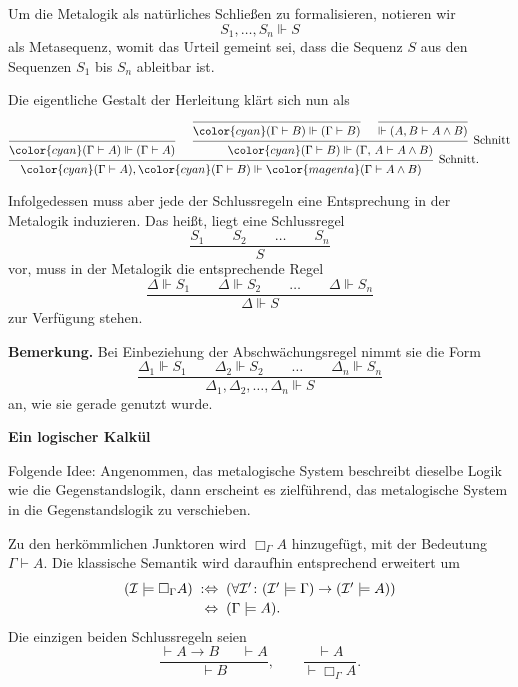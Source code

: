 \documentclass[9pt,fleqn,aspectratio=169]{beamer}
\newcommand{\strong}[1]{\textbf{#1}}
\newcommand{\parspace}{\vspace{0.8em}}
\newcommand{\headline}[1]{\begin{center}\strong{#1}\end{center}}
\newcommand{\lnec}{\Box}
\begin{document}
\begin{frame}
Um die Metalogik als natürliches Schließen zu formalisieren,
notieren wir
\[S_1,\ldots,S_n\Vdash S\]
als Metasequenz, womit das Urteil gemeint sei, dass die Sequenz $S$ aus
den Sequenzen $S_1$ bis $S_n$ ableitbar ist.\pause

\parspace
Die eigentliche Gestalt der Herleitung klärt sich nun als
\[\begin{prooftree}
  \infer0{{\color{cyan}(\Gamma\vdash A)}\Vdash (\Gamma\vdash A)}
    \infer0{{\color{cyan}(\Gamma\vdash B)}\Vdash (\Gamma\vdash B)}
    \infer0{\Vdash (A,B\vdash A\land B)}
  \infer2[Schnitt]{{\color{cyan}(\Gamma\vdash B)}\Vdash (\Gamma,\,A\vdash A\land B)}
\infer2[Schnitt.]{{\color{cyan}(\Gamma\vdash A)},{\color{cyan}(\Gamma\vdash B)}\Vdash
  \color{magenta}(\Gamma\vdash A\land B)}
\end{prooftree}\]
\end{frame}

\begin{frame}
Infolgedessen muss aber jede der Schlussregeln eine Entsprechung
in der Metalogik induzieren. Das heißt, liegt eine Schlussregel
\[\dfrac{S_1\qquad S_2\qquad\ldots\qquad S_n}{S}\]
vor, muss in der Metalogik die entsprechende Regel
\[\dfrac{\Delta\Vdash S_1\qquad\Delta\Vdash S_2\qquad\ldots\qquad\Delta\Vdash S_n}
{\Delta\Vdash S}\]
zur Verfügung stehen.\pause

\parspace
\begin{footnotesize}
\strong{Bemerkung.} Bei Einbeziehung der Abschwächungsregel nimmt sie die Form
\[\dfrac{\Delta_1\Vdash S_1\qquad\Delta_2\Vdash S_2\qquad\ldots\qquad\Delta_n\Vdash S_n}
{\Delta_1,\Delta_2,\ldots,\Delta_n\Vdash S}\]
an, wie sie gerade genutzt wurde.
\end{footnotesize}
\end{frame}

\begin{frame}
\headline{Ein logischer Kalkül}
\end{frame}

\begin{frame}
Folgende Idee: Angenommen, das metalogische System beschreibt dieselbe
Logik wie die Gegenstandslogik, dann erscheint es zielführend,
das metalogische System in die Gegenstandslogik zu verschieben.\pause{}

\parspace
Zu den herkömmlichen Junktoren wird $\lnec_\Gamma A$ hinzugefügt,
mit der Bedeutung $\Gamma\vdash A$. Die klassische Semantik wird daraufhin
entsprechend erweitert um
\[\begin{array}{r@{}l}
(\mathcal I\models\lnec_\Gamma A)\;: &\Leftrightarrow\;
(\forall\mathcal I'\colon (\mathcal I'\models\Gamma)\to (\mathcal I'\models A))\\[2pt]
\; &\Leftrightarrow\; (\Gamma\models A).
\end{array}\]\pause
Die einzigen beiden Schlussregeln seien
\[\dfrac{\vdash A\to B\quad\;\;\vdash A}{\vdash B},\qquad\dfrac{\vdash A}{\vdash\lnec_\Gamma A}.\]
\end{frame}
\end{document}
